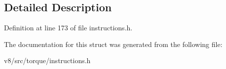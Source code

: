 \subsection{Detailed Description}


Definition at line 173 of file instructions.\+h.



The documentation for this struct was generated from the following file\+:\begin{DoxyCompactItemize}
\item 
v8/src/torque/instructions.\+h\end{DoxyCompactItemize}
